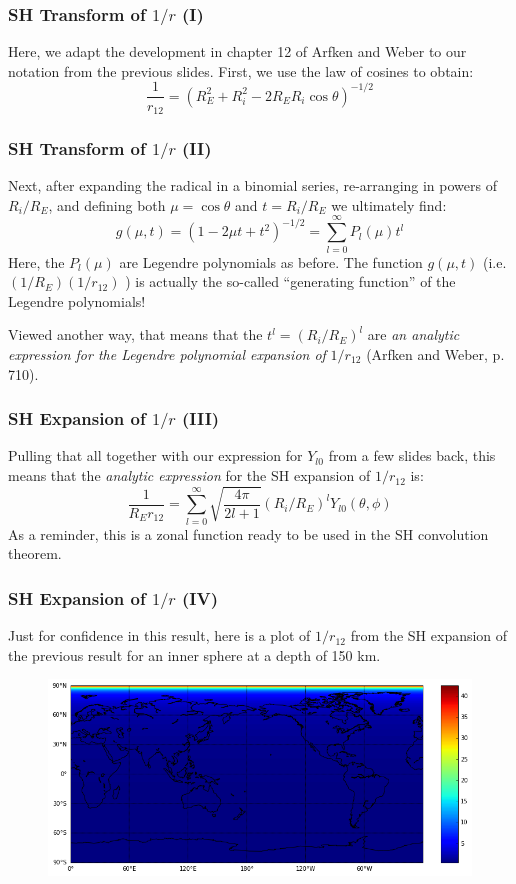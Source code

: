 \documentclass[aspectratio=43,mathserif]{beamer}
\begin{document}
\begin{frame}
\frametitle{SH Transform of \(1/r\) (I)}
Here, we adapt the development in chapter 12 of Arfken and Weber to our notation from the previous slides. First, we use the law of cosines to obtain:
\[\frac{1}{r_{12}} = (R^2_E +R^2_i - 2 R_E R_i \cos \theta)^{-1/2}
\]
\end{frame}

\begin{frame}
\frametitle{SH Transform of \(1/r\) (II)}

Next, after expanding the radical in a binomial series, re-arranging in powers of \(R_i/R_E\), and defining both \(\mu = \cos \theta\) and \(t = R_i / R_E\) we ultimately find:
\[g(\mu,t) = (1 - 2 \mu t + t^2)^{-1/2} = \sum_{l=0}^{\infty} P_l(\mu) t^l
\]
Here, the \(P_l(\mu)\) are Legendre polynomials as before. The function \(g(\mu,t)\) (i.e. \((1/R_E) (1/r_{12})\) ) is actually the so-called ``generating function'' of the Legendre polynomials! 

Viewed another way, that means that the  \(t^l = (R_i/R_E)^l\) are \emph{an analytic expression for the Legendre polynomial expansion of} \(1/r_{12}\) (Arfken and Weber, p. 710). 
\end{frame}

\begin{frame}
\frametitle{SH Expansion of \(1/r\) (III)}
Pulling that all together with our expression for \(Y_{l0}\) from a few slides back, this means that the \emph{analytic expression} for the SH expansion of \(1/r_{12}\) is:
\[
\frac{1}{R_E r_{12}} = \sum_{l=0}^{\infty} \sqrt{\frac{4 \pi}{2l + 1}} (R_i/R_E)^l Y_{l0}(\theta,\phi)
\]
As a reminder, this is a zonal function ready to be used in the SH convolution theorem.
\end{frame}

\begin{frame}
\frametitle{SH Expansion of \(1/r\) (IV)}
Just for confidence in this result, here is a plot of \(1/r_{12}\) from the SH expansion of the previous result for an inner sphere at a depth of 150 km.

\begin{figure}
\includegraphics[width=0.9\linewidth]{OneOnR150km.png}
\end{figure}


\end{frame}
\end{document}
